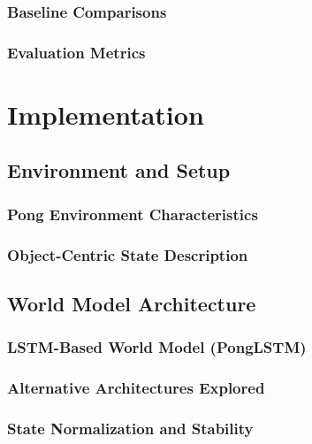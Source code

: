 \documentclass[
	english,
	ruledheaders=section,
	class=report,
	thesis={type=master},
	accentcolor=9c,
	custommargins=true,
	marginpar=false,
	parskip=half-,
	fontsize=11pt,
]{tudapub}
\begin{document}
\subsection{Baseline Comparisons}
\label{subsec:baselines}

\subsection{Evaluation Metrics}
\label{subsec:metrics}

\chapter{Implementation}
\label{chap:implementation}

\section{Environment and Setup}
\label{sec:environment}

\subsection{Pong Environment Characteristics}
\label{subsec:pong_characteristics}

\subsection{Object-Centric State Description}
\label{subsec:state_description}

\section{World Model Architecture}
\label{sec:world_model_arch}

\subsection{LSTM-Based World Model (PongLSTM)}
\label{subsec:ponglstm}

\subsection{Alternative Architectures Explored}
\label{subsec:alternative_architectures}

\subsection{State Normalization and Stability}
\label{subsec:normalization}
\end{document}
